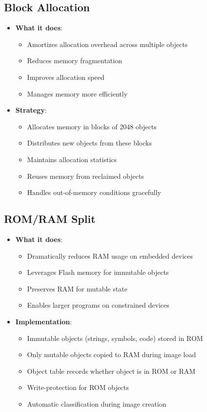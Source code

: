 \documentclass[12pt,a4paper]{report}
\begin{document}
\subsection{Block Allocation}
\begin{itemize}
    \item \textbf{What it does}:
    \begin{itemize}
        \item Amortizes allocation overhead across multiple objects
        \item Reduces memory fragmentation
        \item Improves allocation speed
        \item Manages memory more efficiently
    \end{itemize}
    
    \item \textbf{Strategy}:
    \begin{itemize}
        \item Allocates memory in blocks of 2048 objects
        \item Distributes new objects from these blocks
        \item Maintains allocation statistics
        \item Reuses memory from reclaimed objects
        \item Handles out-of-memory conditions gracefully
    \end{itemize}
\end{itemize}

\subsection{ROM/RAM Split}
\begin{itemize}
    \item \textbf{What it does}:
    \begin{itemize}
        \item Dramatically reduces RAM usage on embedded devices
        \item Leverages Flash memory for immutable objects
        \item Preserves RAM for mutable state
        \item Enables larger programs on constrained devices
    \end{itemize}
    
    \item \textbf{Implementation}:
    \begin{itemize}
        \item Immutable objects (strings, symbols, code) stored in ROM
        \item Only mutable objects copied to RAM during image load
        \item Object table records whether object is in ROM or RAM
        \item Write-protection for ROM objects
        \item Automatic classification during image creation
    \end{itemize}
\end{itemize}
\end{document}
